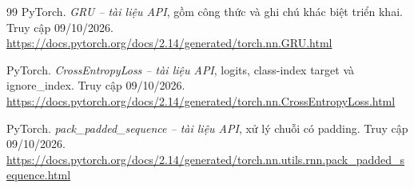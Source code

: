 \documentclass[11pt,a4paper]{article}
\numberwithin{equation}{section}
\begin{document}
\begin{thebibliography}{99}
 PyTorch. \emph{GRU -- tài liệu API}, gồm công thức và ghi chú khác biệt triển khai. Truy cập 09/10/2026.\\
\url{https://docs.pytorch.org/docs/2.14/generated/torch.nn.GRU.html}

 PyTorch. \emph{CrossEntropyLoss -- tài liệu API}, logits, class-index target và ignore\_index. Truy cập 09/10/2026.\\
\url{https://docs.pytorch.org/docs/2.14/generated/torch.nn.CrossEntropyLoss.html}

 PyTorch. \emph{pack\_padded\_sequence -- tài liệu API}, xử lý chuỗi có padding. Truy cập 09/10/2026.\\
\url{https://docs.pytorch.org/docs/2.14/generated/torch.nn.utils.rnn.pack_padded_sequence.html}

\end{thebibliography}
\end{document}
